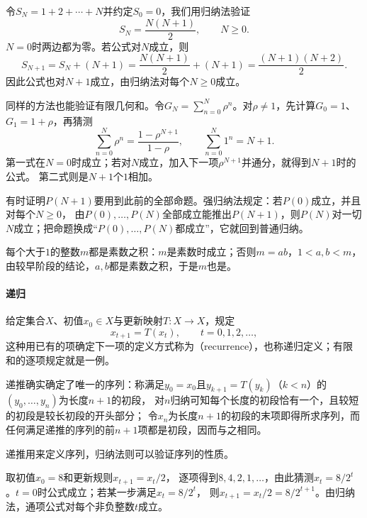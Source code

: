 \begin{example}[前$N$个正整数之和]
\label{ex:sets-induction-arithmetic-sum}
令$S_N=1+2+\cdots+N$并约定$S_0=0$，我们用归纳法验证
\[
 S_N=\frac{N(N+1)}2,\qquad N\geq0.
\]
$N=0$时两边都为零。若公式对$N$成立，则
\[
 S_{N+1}=S_N+(N+1)=\frac{N(N+1)}2+(N+1)=\frac{(N+1)(N+2)}2.
\]
因此公式也对$N+1$成立，由归纳法对每个$N\geq0$成立。
\end{example}

同样的方法也能验证有限几何和。令$G_N=\sum_{n=0}^N\rho^n$。对$\rho\neq1$，先计算$G_0=1$、$G_1=1+\rho$，再猜测
\begin{equation}
 \sum_{n=0}^{N}\rho^n=\frac{1-\rho^{N+1}}{1-\rho},\qquad
 \sum_{n=0}^{N}1^n=N+1.
 \label{eq:prelim-finite-geometric-sum}
\end{equation}
第一式在$N=0$时成立；若对$N$成立，加入下一项$\rho^{N+1}$并通分，就得到$N+1$时的公式。
第二式则是$N+1$个$1$相加。

有时证明$P(N+1)$要用到此前的全部命题。强归纳法规定：若$P(0)$成立，并且对每个$N\geq0$，
由$P(0),\ldots,P(N)$全部成立能推出$P(N+1)$，则$P(N)$对一切$N$成立；把命题换成“$P(0),\ldots,P(N)$都成立”，它就回到普通归纳。
\begin{example}[整数分解为素数之积]
\label{ex:sets-strong-induction-primes}
每个大于$1$的整数$m$都是素数之积：$m$是素数时成立；否则$m=ab$，$1<a,b<m$，由较早阶段的结论，$a,b$都是素数之积，于是$m$也是。
\end{example}

\paragraph{递归}
给定集合$X$、初值$x_0\in X$与更新映射$T:X\to X$，规定
\[
 x_{t+1}=T(x_t),\qquad t=0,1,2,\ldots,
\]
这种用已有的项确定下一项的定义方式称为（recurrence），也称递归定义；有限和的逐项规定就是一例。

递推确实确定了唯一的序列：称满足$y_0=x_0$且$y_{k+1}=T(y_k)$（$k<n$）的$(y_0,\ldots,y_n)$为长度$n+1$的初段，
对$n$归纳可知每个长度的初段恰有一个，且较短的初段是较长初段的开头部分；
令$x_n$为长度$n+1$的初段的末项即得所求序列，而任何满足递推的序列的前$n+1$项都是初段，因而与之相同。


递推用来定义序列，归纳法则可以验证序列的性质。
\begin{example}[折半递推的通项]
\label{ex:sets-halving-recurrence}
取初值$x_0=8$和更新规则$x_{t+1}=x_t/2$，
逐项得到$8,4,2,1,\ldots$，由此猜测$x_t=8/2^t$。$t=0$时公式成立；若某一步满足$x_t=8/2^t$，
则$x_{t+1}=x_t/2=8/2^{t+1}$。由归纳法，通项公式对每个非负整数$t$成立。
\end{example}


